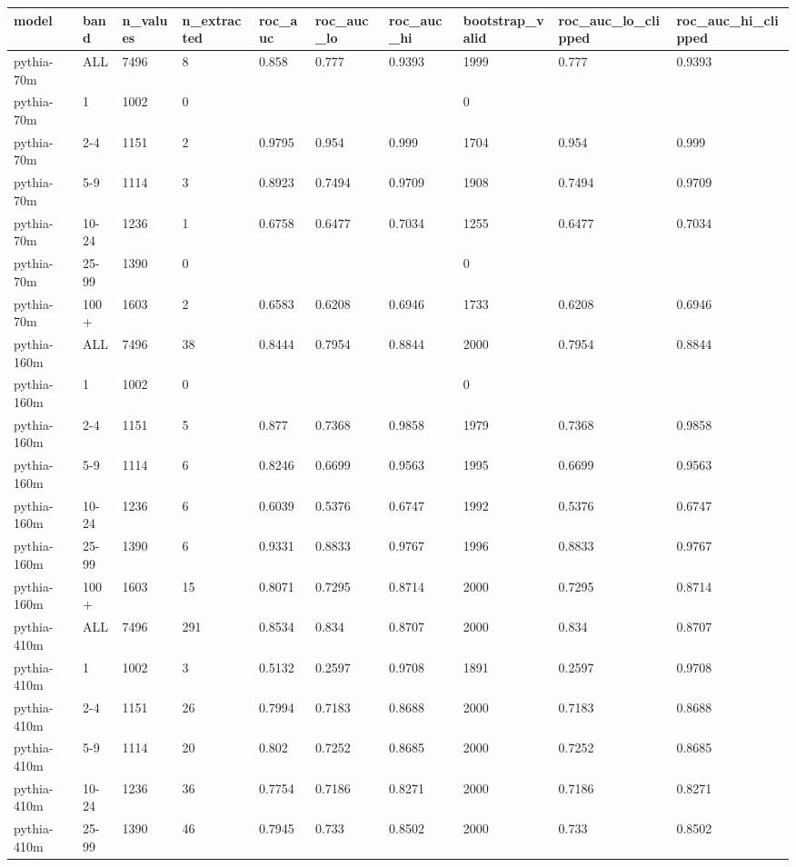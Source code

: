 \begin{tabular}{llllllllll}
\toprule
model & band & n\_values & n\_extracted & roc\_auc & roc\_auc\_lo & roc\_auc\_hi & bootstrap\_valid & roc\_auc\_lo\_clipped & roc\_auc\_hi\_clipped \\
\midrule
pythia-70m & ALL & 7496 & 8 & 0.858 & 0.777 & 0.9393 & 1999 & 0.777 & 0.9393 \\
pythia-70m & 1 & 1002 & 0 &  &  &  & 0 &  &  \\
pythia-70m & 2-4 & 1151 & 2 & 0.9795 & 0.954 & 0.999 & 1704 & 0.954 & 0.999 \\
pythia-70m & 5-9 & 1114 & 3 & 0.8923 & 0.7494 & 0.9709 & 1908 & 0.7494 & 0.9709 \\
pythia-70m & 10-24 & 1236 & 1 & 0.6758 & 0.6477 & 0.7034 & 1255 & 0.6477 & 0.7034 \\
pythia-70m & 25-99 & 1390 & 0 &  &  &  & 0 &  &  \\
pythia-70m & 100+ & 1603 & 2 & 0.6583 & 0.6208 & 0.6946 & 1733 & 0.6208 & 0.6946 \\
pythia-160m & ALL & 7496 & 38 & 0.8444 & 0.7954 & 0.8844 & 2000 & 0.7954 & 0.8844 \\
pythia-160m & 1 & 1002 & 0 &  &  &  & 0 &  &  \\
pythia-160m & 2-4 & 1151 & 5 & 0.877 & 0.7368 & 0.9858 & 1979 & 0.7368 & 0.9858 \\
pythia-160m & 5-9 & 1114 & 6 & 0.8246 & 0.6699 & 0.9563 & 1995 & 0.6699 & 0.9563 \\
pythia-160m & 10-24 & 1236 & 6 & 0.6039 & 0.5376 & 0.6747 & 1992 & 0.5376 & 0.6747 \\
pythia-160m & 25-99 & 1390 & 6 & 0.9331 & 0.8833 & 0.9767 & 1996 & 0.8833 & 0.9767 \\
pythia-160m & 100+ & 1603 & 15 & 0.8071 & 0.7295 & 0.8714 & 2000 & 0.7295 & 0.8714 \\
pythia-410m & ALL & 7496 & 291 & 0.8534 & 0.834 & 0.8707 & 2000 & 0.834 & 0.8707 \\
pythia-410m & 1 & 1002 & 3 & 0.5132 & 0.2597 & 0.9708 & 1891 & 0.2597 & 0.9708 \\
pythia-410m & 2-4 & 1151 & 26 & 0.7994 & 0.7183 & 0.8688 & 2000 & 0.7183 & 0.8688 \\
pythia-410m & 5-9 & 1114 & 20 & 0.802 & 0.7252 & 0.8685 & 2000 & 0.7252 & 0.8685 \\
pythia-410m & 10-24 & 1236 & 36 & 0.7754 & 0.7186 & 0.8271 & 2000 & 0.7186 & 0.8271 \\
pythia-410m & 25-99 & 1390 & 46 & 0.7945 & 0.733 & 0.8502 & 2000 & 0.733 & 0.8502 \\

\end{tabular}
